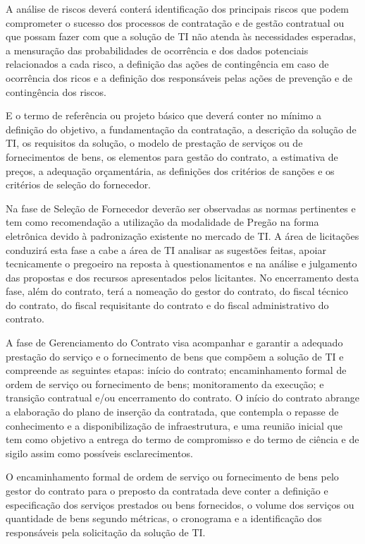 A análise de riscos deverá conterá identificação dos principais riscos que podem comprometer o sucesso dos processos de contratação e de gestão contratual ou que possam fazer com que a solução de TI não atenda às necessidades esperadas, a mensuração das probabilidades de ocorrência e dos dados potenciais relacionados a cada risco, a definição das ações de contingência em caso de ocorrência dos ricos e a definição dos responsáveis pelas ações de prevenção e de contingência dos riscos.

E o termo de referência ou projeto básico que deverá conter no mínimo a definição do objetivo, a fundamentação da contratação, a descrição da solução de TI, os requisitos da solução, o modelo de prestação de serviços ou de fornecimentos de bens, os elementos para gestão do contrato, a estimativa de preços, a adequação orçamentária, as definições dos critérios de sanções e os critérios de seleção do fornecedor. 

Na fase de Seleção de Fornecedor deverão ser observadas as normas pertinentes e tem como recomendação a utilização da modalidade de Pregão na forma eletrônica devido à padronização existente no mercado de TI.  A área de licitações conduzirá esta fase a cabe a área de TI analisar as sugestões feitas, apoiar tecnicamente o pregoeiro na reposta à questionamentos e na análise e julgamento das propostas e dos recursos apresentados pelos licitantes. No encerramento desta fase, além do contrato, terá a nomeação do gestor do contrato, do fiscal técnico do contrato, do fiscal requisitante do contrato e do fiscal administrativo do contrato.

A fase de Gerenciamento do Contrato visa acompanhar e garantir a adequado prestação do serviço e o fornecimento de bens que compõem a solução de TI e compreende as seguintes etapas: início do contrato; encaminhamento formal de ordem de serviço ou fornecimento de bens; monitoramento da execução; e transição contratual e/ou encerramento do contrato. O início do contrato abrange a elaboração do plano de inserção da contratada, que contempla o repasse de conhecimento e a disponibilização de infraestrutura, e uma reunião inicial que tem como objetivo a entrega do termo de compromisso e do termo de ciência e de sigilo assim como possíveis esclarecimentos. 

O encaminhamento formal de ordem de serviço ou fornecimento de bens pelo gestor do contrato para o preposto da contratada deve conter a definição e especificação dos serviços prestados ou bens fornecidos, o volume dos serviços ou quantidade de bens segundo métricas, o cronograma e a identificação dos responsáveis pela solicitação da solução de TI. 

